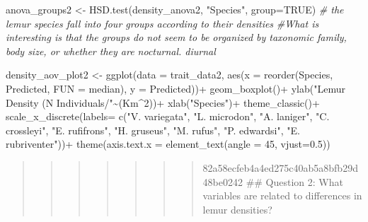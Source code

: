 \documentclass[
  12pt,
]{article}
\newenvironment{Shaded}{\begin{snugshade}}{\end{snugshade}}
\newcommand{\AttributeTok}[1]{\textcolor[rgb]{0.77,0.63,0.00}{#1}}
\newcommand{\CommentTok}[1]{\textcolor[rgb]{0.56,0.35,0.01}{\textit{#1}}}
\newcommand{\ConstantTok}[1]{\textcolor[rgb]{0.00,0.00,0.00}{#1}}
\newcommand{\DecValTok}[1]{\textcolor[rgb]{0.00,0.00,0.81}{#1}}
\newcommand{\FloatTok}[1]{\textcolor[rgb]{0.00,0.00,0.81}{#1}}
\newcommand{\FunctionTok}[1]{\textcolor[rgb]{0.00,0.00,0.00}{#1}}
\newcommand{\NormalTok}[1]{#1}
\newcommand{\OtherTok}[1]{\textcolor[rgb]{0.56,0.35,0.01}{#1}}
\newcommand{\SpecialCharTok}[1]{\textcolor[rgb]{0.00,0.00,0.00}{#1}}
\newcommand{\StringTok}[1]{\textcolor[rgb]{0.31,0.60,0.02}{#1}}
\begin{document}
\begin{Shaded}
\begin{Highlighting}[]
\NormalTok{anova\_groups2 }\OtherTok{\textless{}{-}} \FunctionTok{HSD.test}\NormalTok{(density\_anova2, }\StringTok{"Species"}\NormalTok{, }\AttributeTok{group=}\ConstantTok{TRUE}\NormalTok{)}
\CommentTok{\# the lemur species fall into four groups according to their densities }
\CommentTok{\#What is interesting is that the groups do not seem to be organized by taxonomic family, body size, or whether they are nocturnal. diurnal}

\NormalTok{density\_aov\_plot2 }\OtherTok{\textless{}{-}} \FunctionTok{ggplot}\NormalTok{(}\AttributeTok{data =}\NormalTok{ trait\_data2, }\FunctionTok{aes}\NormalTok{(}\AttributeTok{x =} \FunctionTok{reorder}\NormalTok{(Species, Predicted, }\AttributeTok{FUN =}\NormalTok{ median), }\AttributeTok{y =}\NormalTok{ Predicted))}\SpecialCharTok{+}
  \FunctionTok{geom\_boxplot}\NormalTok{()}\SpecialCharTok{+}
  \FunctionTok{ylab}\NormalTok{(}\StringTok{"Lemur Density (N Individuals/"}\SpecialCharTok{\textasciitilde{}}\NormalTok{(Km}\SpecialCharTok{\^{}}\DecValTok{2}\NormalTok{))}\SpecialCharTok{+}
  \FunctionTok{xlab}\NormalTok{(}\StringTok{"Species"}\NormalTok{)}\SpecialCharTok{+}
  \FunctionTok{theme\_classic}\NormalTok{()}\SpecialCharTok{+}
  \FunctionTok{scale\_x\_discrete}\NormalTok{(}\AttributeTok{labels=} \FunctionTok{c}\NormalTok{(}\StringTok{"V. variegata"}\NormalTok{, }\StringTok{"L. microdon"}\NormalTok{, }\StringTok{"A. laniger"}\NormalTok{, }\StringTok{"C. crossleyi"}\NormalTok{, }\StringTok{"E. rufifrons"}\NormalTok{, }\StringTok{"H. gruseus"}\NormalTok{, }\StringTok{"M. rufus"}\NormalTok{, }\StringTok{"P. edwardsi"}\NormalTok{, }\StringTok{"E. rubriventer"}\NormalTok{))}\SpecialCharTok{+}
  \FunctionTok{theme}\NormalTok{(}\AttributeTok{axis.text.x =} \FunctionTok{element\_text}\NormalTok{(}\AttributeTok{angle =} \DecValTok{45}\NormalTok{, }\AttributeTok{vjust=}\FloatTok{0.5}\NormalTok{))}
\end{Highlighting}
\end{Shaded}

\begin{quote}
\begin{quote}
\begin{quote}
\begin{quote}
\begin{quote}
\begin{quote}
\begin{quote}
82a58ecfeb4a4ed275c40ab5a8bfb29d48be0242 \#\# Question 2: What variables
are related to differences in lemur densities?
\end{quote}
\end{quote}
\end{quote}
\end{quote}
\end{quote}
\end{quote}
\end{quote}
\end{document}
